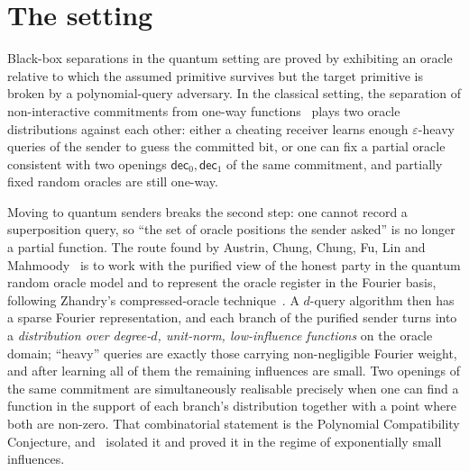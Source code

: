 \documentclass{aicr-conjecture}
\begin{document}
\section{The setting}\label{sec:setting}

Black-box separations in the quantum setting are proved by exhibiting an
oracle relative to which the assumed primitive survives but the target
primitive is broken by a polynomial-query adversary. In the classical
setting, the separation of non-interactive commitments from one-way
functions~\cite{MP12} plays two oracle distributions against each other:
either a cheating receiver learns enough $\varepsilon$-heavy queries of
the sender to guess the committed bit, or one can fix a partial oracle
consistent with two openings $\mathsf{dec}_0,\mathsf{dec}_1$ of the same
commitment, and partially fixed random oracles are still one-way.

Moving to quantum senders breaks the second step: one cannot record a
superposition query, so ``the set of oracle positions the sender asked''
is no longer a partial function. The route found by Austrin, Chung,
Chung, Fu, Lin and Mahmoody~\cite{ACC22} is to work with the purified
view of the honest party in the quantum random oracle model and to
represent the oracle register in the Fourier basis, following Zhandry's
compressed-oracle technique~\cite{Zha19}. A $d$-query algorithm then has
a sparse Fourier representation, and each branch of the purified sender
turns into a \emph{distribution over degree-$d$, unit-norm,
low-influence functions} on the oracle domain; ``heavy'' queries are
exactly those carrying non-negligible Fourier weight, and after learning
all of them the remaining influences are small. Two openings of the same
commitment are simultaneously realisable precisely when one can find a
function in the support of each branch's distribution together with a
point where both are non-zero. That combinatorial statement is the
Polynomial Compatibility Conjecture, and~\cite{ACC22} isolated it and
proved it in the regime of exponentially small influences.
\end{document}
